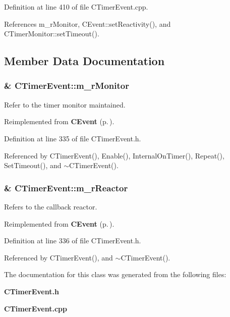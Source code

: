 Definition at line 410 of file CTimer\-Event.cpp.

References m\_\-r\-Monitor, CEvent::set\-Reactivity(), and CTimer\-Monitor::set\-Timeout().

\subsection{Member Data Documentation}
\subsubsection{\& CTimer\-Event::m\_\-r\-Monitor\hspace{0.3cm}{\tt  [private]}}\label{classCTimerEvent_o0}


Refer to the timer monitor maintained.



Reimplemented from {\bf CEvent} {\rm (p.\,\pageref{classCEvent_o4})}.

Definition at line 335 of file CTimer\-Event.h.

Referenced by CTimer\-Event(), Enable(), Internal\-On\-Timer(), Repeat(), Set\-Timeout(), and $\sim$CTimer\-Event().
\subsubsection{\& CTimer\-Event::m\_\-r\-Reactor\hspace{0.3cm}{\tt  [private]}}\label{classCTimerEvent_o1}


Refers to the callback reactor.



Reimplemented from {\bf CEvent} {\rm (p.\,\pageref{classCEvent_o5})}.

Definition at line 336 of file CTimer\-Event.h.

Referenced by CTimer\-Event(), and $\sim$CTimer\-Event().

The documentation for this class was generated from the following files:\begin{CompactItemize}
\item 
{\bf CTimer\-Event.h}\item 
{\bf CTimer\-Event.cpp}\end{CompactItemize}
